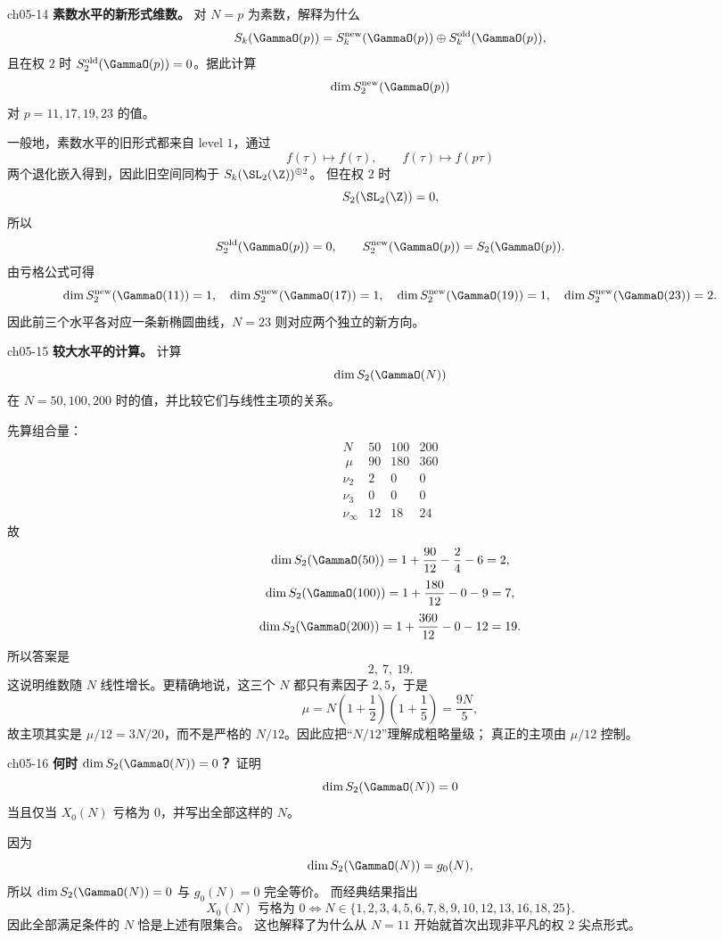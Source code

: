 \begin{problem}{ch05-14}
\textbf{素数水平的新形式维数。}
对 $N=p$ 为素数，解释为什么
\[
S_k(\GammaO(p))=S_k^{\mathrm{new}}(\GammaO(p))\oplus S_k^{\mathrm{old}}(\GammaO(p)),
\]
且在权 $2$ 时 $S_2^{\mathrm{old}}(\GammaO(p))=0$。据此计算
\[
\dim S_2^{\mathrm{new}}(\GammaO(p))
\]
对 $p=11,17,19,23$ 的值。
\end{problem}
\begin{solution}
一般地，素数水平的旧形式都来自 level $1$，通过
\[
f(\tau)\mapsto f(\tau),\qquad f(\tau)\mapsto f(p\tau)
\]
两个退化嵌入得到，因此旧空间同构于 $S_k(\SL_2(\Z))^{\oplus 2}$。
但在权 $2$ 时
\[
S_2(\SL_2(\Z))=0,
\]
所以
\[
S_2^{\mathrm{old}}(\GammaO(p))=0,
\qquad
S_2^{\mathrm{new}}(\GammaO(p))=S_2(\GammaO(p)).
\]
由亏格公式可得
\[
\dim S_2^{\mathrm{new}}(\GammaO(11))=1,
\quad
\dim S_2^{\mathrm{new}}(\GammaO(17))=1,
\quad
\dim S_2^{\mathrm{new}}(\GammaO(19))=1,
\quad
\dim S_2^{\mathrm{new}}(\GammaO(23))=2.
\]
因此前三个水平各对应一条新椭圆曲线，$N=23$ 则对应两个独立的新方向。
\end{solution}

\begin{problem}{ch05-15}
\textbf{较大水平的计算。}
计算
\[
\dim S_2(\GammaO(N))
\]
在 $N=50,100,200$ 时的值，并比较它们与线性主项的关系。
\end{problem}
\begin{solution}
先算组合量：
\[
\begin{array}{c|ccc}
N & 50 & 100 & 200 \\\ \hline
\mu & 90 & 180 & 360 \\
\nu_2 & 2 & 0 & 0 \\
\nu_3 & 0 & 0 & 0 \\
\nu_\infty & 12 & 18 & 24
\end{array}
\]
故
\[
\dim S_2(\GammaO(50))=1+\frac{90}{12}-\frac24-6=2,
\]
\[
\dim S_2(\GammaO(100))=1+\frac{180}{12}-0-9=7,
\]
\[
\dim S_2(\GammaO(200))=1+\frac{360}{12}-0-12=19.
\]
所以答案是
\[
2,\ 7,\ 19.
\]
这说明维数随 $N$ 线性增长。更精确地说，这三个 $N$ 都只有素因子 $2,5$，于是
\[
\mu=N\left(1+\frac12\right)\left(1+\frac15\right)=\frac{9N}{5},
\]
故主项其实是 $\mu/12=3N/20$，而不是严格的 $N/12$。因此应把“$N/12$”理解成粗略量级；
真正的主项由 $\mu/12$ 控制。
\end{solution}

\begin{problem}{ch05-16}
\textbf{何时 $\dim S_2(\GammaO(N))=0$？}
证明
\[
\dim S_2(\GammaO(N))=0
\]
当且仅当 $X_0(N)$ 亏格为 $0$，并写出全部这样的 $N$。
\end{problem}
\begin{solution}
因为
\[
\dim S_2(\GammaO(N))=g_0(N),
\]
所以 $\dim S_2(\GammaO(N))=0$ 与 $g_0(N)=0$ 完全等价。
而经典结果指出
\[
X_0(N)\text{ 亏格为 }0
\iff
N\in\{1,2,3,4,5,6,7,8,9,10,12,13,16,18,25\}.
\]
因此全部满足条件的 $N$ 恰是上述有限集合。
这也解释了为什么从 $N=11$ 开始就首次出现非平凡的权 $2$ 尖点形式。
\end{solution}

